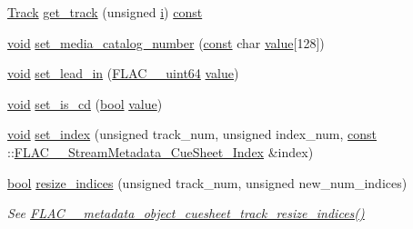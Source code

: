 \begin{DoxyCompactItemize}
\hyperlink{class_f_l_a_c_1_1_metadata_1_1_cue_sheet_1_1_track}{Track} \hyperlink{class_f_l_a_c_1_1_metadata_1_1_cue_sheet_aaa02ed9fe6f361b340ba8f2fcf1cd8a2}{get\+\_\+track} (unsigned \hyperlink{checksum_8c_ab80e330a3bc9e38c1297fe17381e92b4}{i}) \hyperlink{getopt1_8c_a2c212835823e3c54a8ab6d95c652660e}{const} 
\item 
\hyperlink{sound_8c_ae35f5844602719cf66324f4de2a658b3}{void} \hyperlink{class_f_l_a_c_1_1_metadata_1_1_cue_sheet_ab870f6ff2b44149494914163d78ecd2a}{set\+\_\+media\+\_\+catalog\+\_\+number} (\hyperlink{getopt1_8c_a2c212835823e3c54a8ab6d95c652660e}{const} char \hyperlink{lib_2expat_8h_a4a30a13b813682e68c5b689b45c65971}{value}\mbox{[}128\mbox{]})
\item 
\hyperlink{sound_8c_ae35f5844602719cf66324f4de2a658b3}{void} \hyperlink{class_f_l_a_c_1_1_metadata_1_1_cue_sheet_a9574767b8d13e88d804a42e9d37187a6}{set\+\_\+lead\+\_\+in} (\hyperlink{ordinals_8h_aa78c8c70a3eb8a58af7436f278acde8e}{F\+L\+A\+C\+\_\+\+\_\+uint64} \hyperlink{lib_2expat_8h_a4a30a13b813682e68c5b689b45c65971}{value})
\item 
\hyperlink{sound_8c_ae35f5844602719cf66324f4de2a658b3}{void} \hyperlink{class_f_l_a_c_1_1_metadata_1_1_cue_sheet_a8fb5d848cf386a9f63ceaa2153e4e0c7}{set\+\_\+is\+\_\+cd} (\hyperlink{mac_2config_2i386_2lib-src_2libsoxr_2soxr-config_8h_abb452686968e48b67397da5f97445f5b}{bool} \hyperlink{lib_2expat_8h_a4a30a13b813682e68c5b689b45c65971}{value})
\item 
\hyperlink{sound_8c_ae35f5844602719cf66324f4de2a658b3}{void} \hyperlink{class_f_l_a_c_1_1_metadata_1_1_cue_sheet_aa061e5116d5607c01b921d8ddcbe1999}{set\+\_\+index} (unsigned track\+\_\+num, unsigned index\+\_\+num, \hyperlink{getopt1_8c_a2c212835823e3c54a8ab6d95c652660e}{const} \+::\hyperlink{struct_f_l_a_c_____stream_metadata___cue_sheet___index}{F\+L\+A\+C\+\_\+\+\_\+\+Stream\+Metadata\+\_\+\+Cue\+Sheet\+\_\+\+Index} \&index)
\item 
\hyperlink{mac_2config_2i386_2lib-src_2libsoxr_2soxr-config_8h_abb452686968e48b67397da5f97445f5b}{bool} \hyperlink{class_f_l_a_c_1_1_metadata_1_1_cue_sheet_a01c7fd10f7c139890aa714b8367224f4}{resize\+\_\+indices} (unsigned track\+\_\+num, unsigned new\+\_\+num\+\_\+indices)
\begin{DoxyCompactList}\small\item\em See \hyperlink{group__flac__metadata__object_ga57dfba89ba704574bde4e3fcd925d473}{F\+L\+A\+C\+\_\+\+\_\+metadata\+\_\+object\+\_\+cuesheet\+\_\+track\+\_\+resize\+\_\+indices()} \end{DoxyCompactList}\item 

\end{DoxyCompactItemize}
